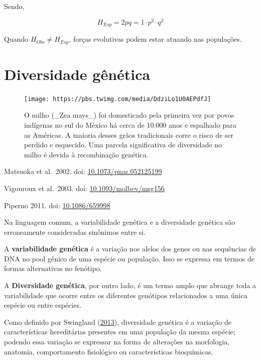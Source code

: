 \documentclass[
]{book}
\begin{document}
Sendo,

\[H_{Esp} = 2pq =  1 – p^2 – q^2\]

Quando \(H_{Obs} \neq H_{Esp}\), forças evolutivas podem estar atuando nas populações.

\hypertarget{diversidade-guxeanuxe9tica}{%
\section{Diversidade gênética}\label{diversidade-guxeanuxe9tica}}

\begin{figure}

{\centering \texttt{[image: https://pbs.twimg.com/media/DdziLo1U0AEPdfJ]} 

}

\caption{O milho (_Zea mays_) foi domesticado pela primeira vez por povos indígenas no sul do México há cerca de 10.000 anos e espalhado para as Américas. A maioria desses grãos tradicionais corre o risco de ser perdido e esquecido. Uma parcela significativa de diversidade no milho é devida à recombinação genética.}\label{fig:zea}
\end{figure}

Matsuoka et al.~2002. doi: \href{https://doi.org/\%5B10.1073/pnas.052125199}{10.1073/pnas.052125199}

Vigouroux et al.~2003. doi: \href{https://doi.org/10.1093/molbev/msg156}{10.1093/molbev/msg156}

Piperno 2011. doi: \href{https://doi.org/10.1086/659998}{10.1086/659998}

Na linguagem comum, a variabilidade genética e a diversidade genética são erroneamente consideradas sinônimos entre si.

A \textbf{variabilidade genética} é a variação nos alelos dos genes ou nas sequências de DNA no pool gênico de uma espécie ou população. Isso se expressa em termos de formas alternativas no fenótipo.

A \textbf{Diversidade genética}, por outro lado, é um termo amplo que abrange toda a variabilidade que ocorre entre os diferentes genótipos relacionados a uma única espécie ou entre espécies.

Como definido por Swingland (\href{https://doi.org/10.1016/B978-0-12-384719-5.00009-5}{2013}), diversidade genética é a variação de características hereditárias presentes em uma população da mesma espécie; podendo essa variação se expressar na forma de alterações na morfologia, anatomia, comportamento fisiológico ou características bioquímicas.
\end{document}
